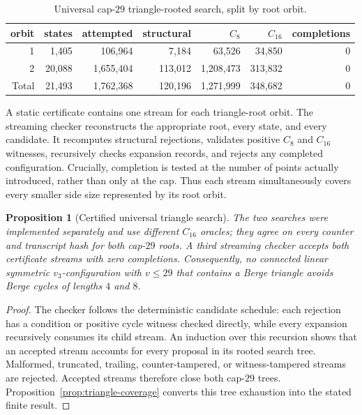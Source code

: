\documentclass[11pt]{article}
\newtheorem{proposition}[theorem]{Proposition}
\theoremstyle{definition}
\begin{document}
\begin{table}[ht]
\centering
\small
\caption{Universal cap-$29$ triangle-rooted search, split by root orbit.}
\label{tab:triangle-orbits}
\begin{tabular}{rrrrrrr}
\toprule
orbit & states & attempted & structural & $C_8$ & $C_{16}$ & completions\\
\midrule
1 & 1,405 & 106,964 & 7,184 & 63,526 & 34,850 & 0\\
2 & 20,088 & 1,655,404 & 113,012 & 1,208,473 & 313,832 & 0\\
\midrule
Total & 21,493 & 1,762,368 & 120,196 & 1,271,999 & 348,682 & 0\\
\bottomrule
\end{tabular}
\end{table}

A static certificate contains one stream for each triangle-root orbit. The
streaming checker reconstructs the appropriate root, every state, and every
candidate. It recomputes structural
rejections, validates positive \(C_8\) and \(C_{16}\) witnesses, recursively
checks expansion records, and rejects any completed configuration. Crucially,
completion is tested at the number of points actually introduced, rather
than only at the cap. Thus each stream simultaneously covers every smaller
side size represented by its root orbit.

\begin{proposition}[Certified universal triangle search]
\label{prop:triangle-search}
The two searches were implemented separately and use different \(C_{16}\)
oracles; they agree on every counter and transcript hash for both cap-\(29\)
roots. A third streaming checker accepts both certificate streams with zero
completions. Consequently, no connected linear symmetric
\(v_3\)-configuration with \(v\leq29\) that
contains a Berge triangle avoids Berge cycles of lengths \(4\) and \(8\).
\end{proposition}

\begin{proof}
The checker follows the deterministic candidate schedule: each
rejection has a condition or positive cycle witness checked directly, while
every expansion recursively consumes its child stream. An induction
over this recursion shows that an accepted stream accounts for every proposal
in its rooted search tree. Malformed, truncated, trailing, counter-tampered,
or witness-tampered streams are rejected. Accepted streams therefore close
both cap-\(29\) trees. Proposition~\ref{prop:triangle-coverage} converts this
tree exhaustion into the stated finite result.
\end{proof}
\end{document}
